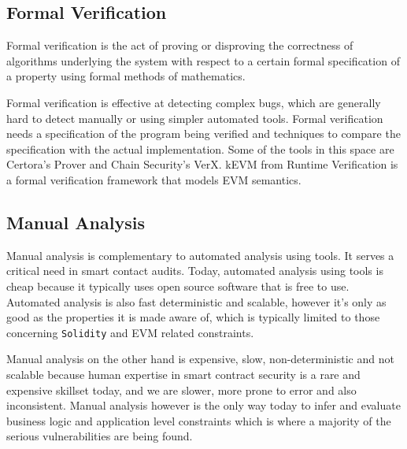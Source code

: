 \subsection{Formal Verification}\label{formal-verification}

Formal verification is the act of proving or disproving the correctness
of algorithms underlying the system with respect to a certain formal
specification of a property using formal methods of mathematics.

Formal verification is effective at detecting complex bugs, which are
generally hard to detect manually or using simpler automated tools.
Formal verification needs a specification of the program being verified
and techniques to compare the specification with the actual
implementation. Some of the tools in this space are Certora's Prover and
Chain Security's VerX. kEVM from Runtime Verification is a formal
verification framework that models EVM semantics.

\subsection{Manual Analysis}\label{manual-analysis}

Manual analysis is complementary to automated analysis using tools. It
serves a critical need in smart contact audits. Today, automated
analysis using tools is cheap because it typically uses open source
software that is free to use. Automated analysis is also fast
deterministic and scalable, however it's only as good as the properties
it is made aware of, which is typically limited to those concerning
\texttt{Solidity} and EVM related constraints.

Manual analysis on the other hand is expensive, slow, non-deterministic
and not scalable because human expertise in smart contract security is a
rare and expensive skillset today, and we are slower, more prone to
error and also inconsistent. Manual analysis however is the only way
today to infer and evaluate business logic and application level
constraints which is where a majority of the serious vulnerabilities are
being found.
